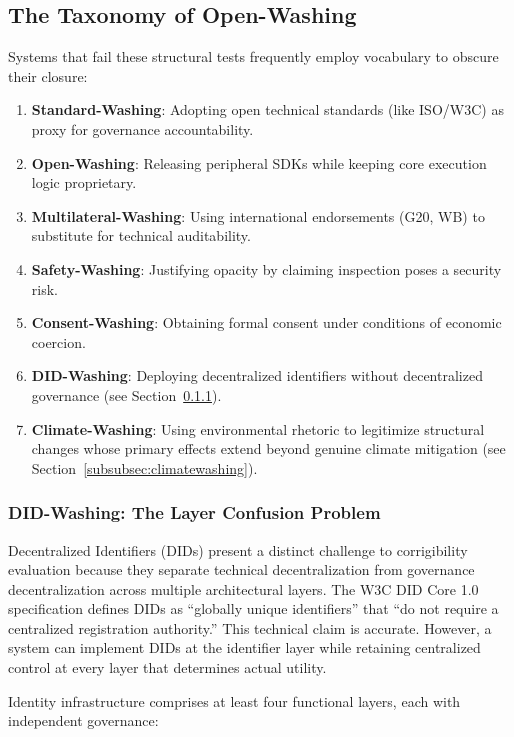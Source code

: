 \documentclass{article}
\begin{document}
\subsection{The Taxonomy of Open-Washing}
\label{subsec:openwashing}

Systems that fail these structural tests frequently employ vocabulary to obscure their closure:
\begin{enumerate}
    \item \textbf{Standard-Washing}: Adopting open technical standards (like ISO/W3C) as proxy for governance accountability.
    \item \textbf{Open-Washing}: Releasing peripheral SDKs while keeping core execution logic proprietary.
    \item \textbf{Multilateral-Washing}: Using international endorsements (G20, WB) to substitute for technical auditability.
    \item \textbf{Safety-Washing}: Justifying opacity by claiming inspection poses a security risk.
    \item \textbf{Consent-Washing}: Obtaining formal consent under conditions of economic coercion.
    \item \textbf{DID-Washing}: Deploying decentralized identifiers without decentralized governance (see Section~\ref{subsubsec:didwashing}).
    \item \textbf{Climate-Washing}: Using environmental rhetoric to legitimize structural changes whose primary effects extend beyond genuine climate mitigation (see Section~\ref{subsubsec:climatewashing}).
\end{enumerate}

\subsubsection{DID-Washing: The Layer Confusion Problem}
\label{subsubsec:didwashing}

Decentralized Identifiers (DIDs) present a distinct challenge to corrigibility evaluation because they separate technical decentralization from governance decentralization across multiple architectural layers. The W3C DID Core 1.0 specification \citep{w3cdid2022} defines DIDs as ``globally unique identifiers'' that ``do not require a centralized registration authority.'' This technical claim is accurate. However, a system can implement DIDs at the identifier layer while retaining centralized control at every layer that determines actual utility.

Identity infrastructure comprises at least four functional layers, each with independent governance:
\end{document}
